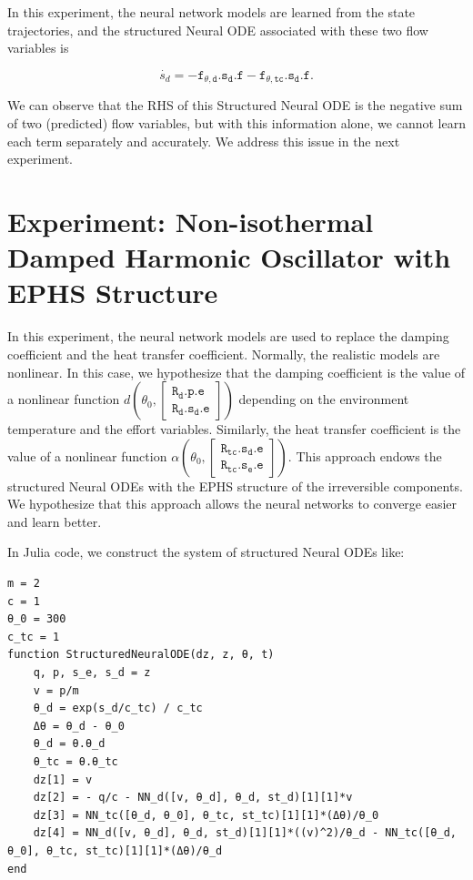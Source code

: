 \documentclass[
	parskip, 			   %
	twoside, 			   %
	DIV=14, 			   %
	BCOR=15.0mm, 		   %
	headsepline, 		   %
	open=right, 		   %
	captions=tableheading, %
	bibliography=totoc,    %
	numbers=noenddot       %
]{scrreprt}
\begin{document}
In this experiment, the neural network models are learned from the state trajectories, and the structured Neural ODE associated with these two flow variables is

\begin{equation}
    \label{eq:NeuralODE_ndho_EPHS_last_line}
    \dot{s_d} = -\mathtt{f_{\theta, d}.s_{d}.f}-\mathtt{f_{\theta, tc}.s_{d}.f}.
\end{equation}

We can observe that the RHS of this Structured Neural ODE is the negative sum of two (predicted) flow variables, but with this information alone, we cannot learn each term separately and accurately. We address this issue in the next experiment.

\clearpage
\section{Experiment: Non-isothermal Damped Harmonic Oscillator with EPHS Structure}
In this experiment, the neural network models are used to replace the damping coefficient and the heat transfer coefficient. Normally, the realistic models are nonlinear. In this case, we hypothesize that the damping coefficient is the value of a nonlinear function $d \left( \theta_0, \left[\begin{array}{l}\mathtt{R_{d}.p.e} \\ \mathtt{R_{d}.s_{d}.e}\end{array}\right] \right)$ depending on the environment temperature and the effort variables. Similarly, the heat transfer coefficient is the value of a nonlinear function $\alpha \left( \theta_0, \left[\begin{array}{l} \mathtt{R_{tc}.s_{d}.e} \\ \mathtt{R_{tc}.s_{e}.e}\end{array}\right] \right)$. This approach endows the structured Neural ODEs with the EPHS structure of the irreversible components. We hypothesize that this approach allows the neural networks to converge easier and learn better.

In Julia code, we construct the system of structured Neural ODEs like:

\begin{verbatim}
m = 2
c = 1
θ_0 = 300
c_tc = 1
function StructuredNeuralODE(dz, z, θ, t)
    q, p, s_e, s_d = z
    v = p/m
    θ_d = exp(s_d/c_tc) / c_tc
    Δθ = θ_d - θ_0
    θ_d = θ.θ_d
    θ_tc = θ.θ_tc   
    dz[1] = v
    dz[2] = - q/c - NN_d([v, θ_d], θ_d, st_d)[1][1]*v
    dz[3] = NN_tc([θ_d, θ_0], θ_tc, st_tc)[1][1]*(Δθ)/θ_0
    dz[4] = NN_d([v, θ_d], θ_d, st_d)[1][1]*((v)^2)/θ_d - NN_tc([θ_d, θ_0], θ_tc, st_tc)[1][1]*(Δθ)/θ_d
end
\end{verbatim}
\end{document}
